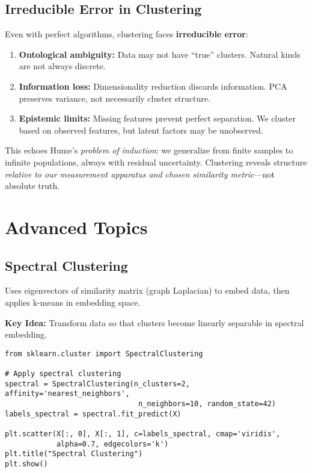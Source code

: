 \subsection{Irreducible Error in Clustering}

\begin{philosophical}
Even with perfect algorithms, clustering faces \textbf{irreducible error}:

\begin{enumerate}
    \item \textbf{Ontological ambiguity:} Data may not have ``true'' clusters. Natural kinds are not always discrete.
    
    \item \textbf{Information loss:} Dimensionality reduction discards information. PCA preserves variance, not necessarily cluster structure.
    
    \item \textbf{Epistemic limits:} Missing features prevent perfect separation. We cluster based on observed features, but latent factors may be unobserved.
\end{enumerate}

This echoes Hume's \textit{problem of induction}: we generalize from finite samples to infinite populations, always with residual uncertainty. Clustering reveals structure \textit{relative to our measurement apparatus and chosen similarity metric}---not absolute truth.
\end{philosophical}

\section{Advanced Topics}

\subsection{Spectral Clustering}

\begin{definition}
Uses eigenvectors of similarity matrix (graph Laplacian) to embed data, then applies k-means in embedding space.

\textbf{Key Idea:} Transform data so that clusters become linearly separable in spectral embedding.
\end{definition}

\begin{codebox}
\begin{lstlisting}
from sklearn.cluster import SpectralClustering

# Apply spectral clustering
spectral = SpectralClustering(n_clusters=2, affinity='nearest_neighbors', 
                               n_neighbors=10, random_state=42)
labels_spectral = spectral.fit_predict(X)

plt.scatter(X[:, 0], X[:, 1], c=labels_spectral, cmap='viridis', 
            alpha=0.7, edgecolors='k')
plt.title("Spectral Clustering")
plt.show()
\end{lstlisting}
\end{codebox}

